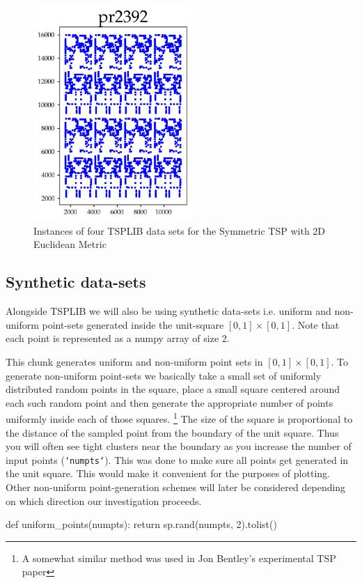 \begin{figure}[htbp]
   \includegraphics[width=6cm]{../tsplib_euc2d_pictures_of_instances/pr2392.png}
   \caption{\label{fig:tsplibinstances} Instances of four TSPLIB data sets for the Symmetric TSP with 2D Euclidean Metric}
 \end{figure}



\subsection{Synthetic data-sets}
Alongside TSPLIB we will also be using synthetic data-sets i.e. uniform and non-uniform point-sets generated inside the unit-square $[0,1] \times [0,1]$. 
Note that each point is represented as a numpy array of size 2. 

This chunk generates uniform and non-uniform point sets in $[0,1] \times [0,1]$. To generate non-uniform point-sets we basically 
take a small set of uniformly distributed random points in the square, place a small square centered around each such random point and then
generate the appropriate number of points uniformly inside each of those squares. \footnote{A somewhat similar method was used in Jon Bentley's experimental TSP paper}
The size of the square is proportional to the distance of the sampled point from the boundary of the unit square. Thus you will often see tight clusters
near the boundary as you increase the number of input points (\texttt{`numpts`}). This was done to make sure all points get generated in the unit square. 
This would make it convenient for the purposes of plotting. Other non-uniform point-generation schemes will later be considered depending on which 
direction our investigation proceeds. 


\nwenddocs{}\endmoddef\nwstartdeflinemarkup{}\nwenddeflinemarkup
def uniform_points(numpts):
     return  sp.rand(numpts, 2).tolist()

